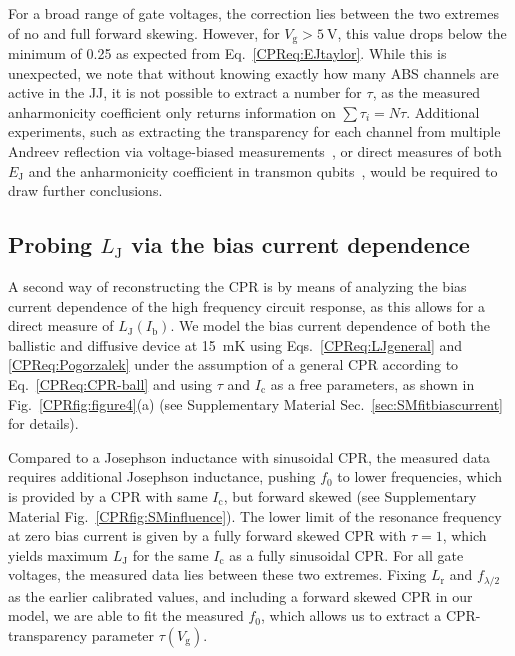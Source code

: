 For a broad range of gate voltages, the correction lies between the two extremes of no and full forward skewing.
%
However, for $V_\text{g}>\SI{5}{\volt}$, this value drops below the minimum of 0.25 as expected from Eq.~\ref{CPReq:EJtaylor}.
%
While this is unexpected, we note that without knowing exactly how many ABS channels are active in the JJ, it is not possible to extract a number for $\tau$, as the measured anharmonicity coefficient only returns information on $\sum\tau_i=N\tau$.
%
Additional experiments, such as extracting the transparency for each channel from multiple Andreev reflection via voltage-biased measurements~\cite{scheerConductionChannelTransmissions1997,goffmanConductionChannelsInAsAl2017,bretheauTunnellingSpectroscopyAndreev2017a,pandeyAndreevReflectionBallistic2019}, or direct measures of both $E_\text{J}$ and the anharmonicity coefficient in transmon qubits~\cite{larsenSemiconductorNanowireBasedSuperconductingQubit2015, delangeRealizationMicrowaveQuantum2015, casparisGatemonBenchmarkingTwoQubit2016a,casparisSuperconductingGatemonQubit2018}, would be required to draw further conclusions.


\subsection{Probing $L_\text{J}$ via the bias current dependence}

A second way of reconstructing the CPR is by means of analyzing the bias current dependence of the high frequency circuit response, as this allows for a direct measure of $L_\text{J}(I_\text{b})$.
%
We model the bias current dependence of both the ballistic and diffusive device at \SI{15}{\milli\kelvin} using Eqs.~\ref{CPReq:LJgeneral} and \ref{CPReq:Pogorzalek} under the assumption of a general CPR according to Eq.~\ref{CPReq:CPR-ball} and using $\tau$ and $I_\text{c}$ as a free parameters, as shown in Fig.~\ref{CPRfig:figure4}(a) (see Supplementary Material Sec.~\ref{sec:SMfitbiascurrent} for details).

Compared to a Josephson inductance with sinusoidal CPR, the measured data requires additional Josephson inductance, pushing $f_0$ to lower frequencies, which is provided by a CPR with same $I_\text{c}$, but forward skewed (see Supplementary Material Fig.~\ref{CPRfig:SMinfluence}).
%
The lower limit of the resonance frequency at zero bias current is given by a fully forward skewed CPR with $\tau=1$, which yields maximum $L_\text{J}$ for the same $I_\text{c}$ as a fully sinusoidal CPR.
%
For all gate voltages, the measured data lies between these two extremes.
%
Fixing $L_\text{r}$ and $f_{\lambda/2}$ as the earlier calibrated values, and including a forward skewed CPR in our model, we are able to fit the measured $f_0$, which allows us to extract a CPR-transparency parameter $\tau(V_\text{g})$.

